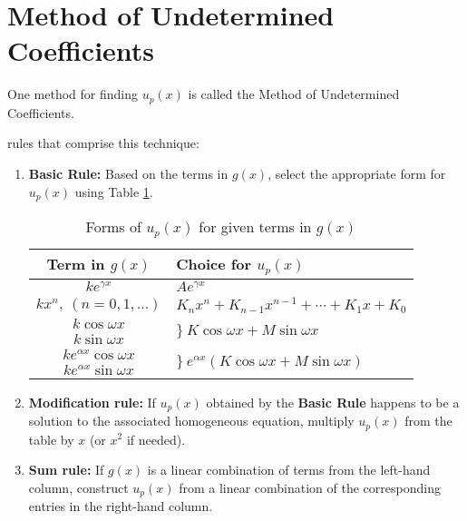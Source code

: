 \section{Method of Undetermined Coefficients}
One method for finding $u_p(x)$ is called the Method of Undetermined Coefficients.

 rules that comprise this technique:

\begin{enumerate}
\item \textbf{Basic Rule:} Based on the terms in $g(x)$, select the appropriate form for $u_p(x)$ using Table \ref{tab:method-of-guessing-table}.

\begin{table}[h]
\begin{center}
\begin{tabular}{|c|l|}
\hline
Term in $g(x)$ & Choice for $u_p(x)$ \\\hline%

$ke^{\gamma x}$ & $Ae^{\gamma x}$ \\\hline
$kx^{n}, \ (n=0,1,\dots)$ & $K_nx^n+K_{n-1}x^{n-1}+\cdots +K_1x+K_0$\\\hline
$k \cos{\omega x}$ & \multirow{2}{*}{$\Big\} \ K\cos{\omega x} + M\sin{\omega x}$}\\\cline{1-1}
$k \sin{\omega x}$ &                 \\\hline
$ke^{\alpha x}\cos{\omega x}$   & \multirow{2}{*}{$\Big\} \ e^{\alpha x}\left(K\cos{\omega x} + M\sin{\omega x}\right)$}\\\cline{1-1} 
$ke^{\alpha x}\sin{\omega x}$ &      \\\hline
\end{tabular}
\end{center}
\caption{Forms of $u_p(x)$ for given terms in $g(x)$}
\label{tab:method-of-guessing-table}
\end{table}

\item \textbf{Modification rule:} If $u_p(x)$ obtained by the \textbf{Basic Rule} happens to be a solution to the associated homogeneous equation, multiply $u_p(x)$ from the table by $x$ (or $x^2$ if needed).

\item \textbf{Sum rule:} If $g(x)$ is a linear combination of terms from the left-hand column, construct $u_p(x)$ from a linear combination of the corresponding entries in the right-hand column.
\end{enumerate}
